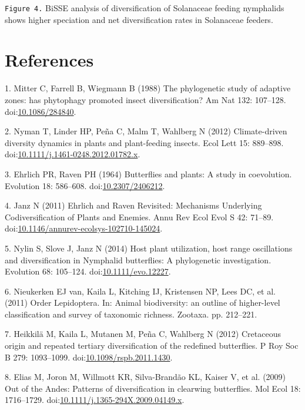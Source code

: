 \documentclass[10pt]{article}
\begin{document}
\texttt{Figure 4.} BiSSE analysis of diversification of Solanaceae feeding 
nymphalids shows higher speciation and net diversification
rates in Solanaceae feeders.



\section*{References}
1. Mitter C, Farrell B, Wiegmann B (1988) The phylogenetic study of
adaptive zones: has phytophagy promoted insect diversification? Am Nat
132: 107--128.
doi:\href{http://dx.doi.org/10.1086/284840}{10.1086/284840}.

2. Nyman T, Linder HP, Pe\~na C, Malm T, Wahlberg N (2012) Climate-driven
diversity dynamics in plants and plant-feeding insects. Ecol Lett 15:
889--898.
doi:\href{http://dx.doi.org/10.1111/j.1461-0248.2012.01782.x}{10.1111/j.1461-0248.2012.01782.x}.

3. Ehrlich PR, Raven PH (1964) Butterflies and plants: A study in
coevolution. Evolution 18: 586--608.
doi:\href{http://dx.doi.org/10.2307/2406212}{10.2307/2406212}.

4. Janz N (2011) Ehrlich and Raven Revisited: Mechanisms Underlying
Codiversification of Plants and Enemies. Annu Rev Ecol Evol S 42:
71--89.
doi:\href{http://dx.doi.org/10.1146/annurev-ecolsys-102710-145024}{10.1146/annurev-ecolsys-102710-145024}.

5. Nylin S, Slove J, Janz N (2014) Host plant utilization, host range
oscillations and diversification in Nymphalid butterflies: A
phylogenetic investigation. Evolution 68: 105--124.
doi:\href{http://dx.doi.org/10.1111/evo.12227}{10.1111/evo.12227}.

6. Nieukerken EJ van, Kaila L, Kitching IJ, Kristensen NP, Lees DC, et
al. (2011) Order Lepidoptera. In: Animal biodiversity: an outline of
higher-level classification and survey of taxonomic richness. Zootaxa.
pp. 212--221.

7. Heikkil\"a M, Kaila L, Mutanen M, Pe\~na C, Wahlberg N (2012) Cretaceous
origin and repeated tertiary diversification of the redefined
butterflies. P Roy Soc B 279: 1093--1099.
doi:\href{http://dx.doi.org/10.1098/rspb.2011.1430}{10.1098/rspb.2011.1430}.

8. Elias M, Joron M, Willmott KR, Silva-Brand\~ao KL, Kaiser V, et al.
(2009) Out of the Andes: Patterns of diversification in clearwing
butterflies. Mol Ecol 18: 1716--1729.
doi:\href{http://dx.doi.org/10.1111/j.1365-294X.2009.04149.x}{10.1111/j.1365-294X.2009.04149.x}.
\end{document}
